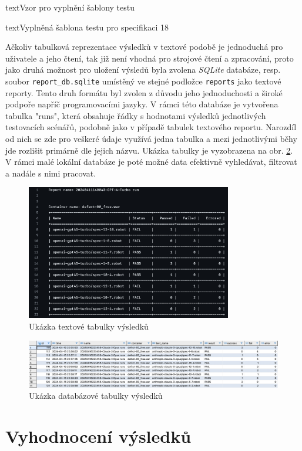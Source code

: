 \documentclass[czech, ma, kiv, he, iso690numb, pdf, viewonly]{fasthesis}
\begin{document}
\begin{code}{text}{Vzor pro vyplnění šablony testu \label{lst:template}}
{\begin{code}{text}{Vyplněná šablona testu pro specifikaci 18 \label{lst:spec18}}
{    Ačkoliv tabulková reprezentace výsledků v textové podobě je jednoduchá pro uživatele a jeho čtení, tak již není vhodná pro strojové čtení a zpracování, proto jako druhá možnost pro uložení výsledů byla zvolena \textit{SQLite} databáze, resp. soubor \verb|report_db.sqlite| umístěný ve stejné podložce \verb|reports| jako textové reporty. Tento druh formátu byl zvolen z důvodu jeho jednoduchosti a široké podpoře napříč programovacími jazyky. V rámci této databáze je vytvořena tabulka "runs", která obsahuje řádky s hodnotami výsledků jednotlivých testovacích scénářů, podobně jako v případě tabulek textového reportu. Narozdíl od nich se zde pro veškeré údaje využívá jedna tabulka a mezi jednotlivými běhy jde rozlišit primárně dle jejich názvu. Ukázka tabulky je vyzobrazena na obr. \ref{fig:sqlite_report}. V rámci malé lokální databáze je poté možné data efektivně vyhledávat, filtrovat a nadále s nimi pracovat.
   
    \begin{figure}
        \includegraphics[width=0.8\textwidth]{pic/report_table.png}
        \centering
        \caption{Ukázka textové tabulky výsledků}
        \label{fig:report_table}
    \end{figure}

    \begin{figure}
        \includegraphics[width=\textwidth]{pic/sqlite_example.png}
        \centering
        \caption{Ukázka databázové tabulky výsledků}
        \label{fig:sqlite_report}
    \end{figure}

\chapter{Vyhodnocení výsledků}

}
\end{code}}
\end{code}
\end{document}
